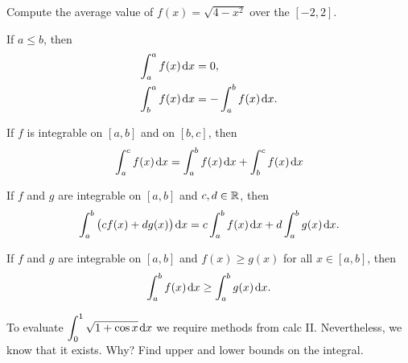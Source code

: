 \begin{example}
Compute the average value of $f(x)=\sqrt{4-x^2}$ over the $[-2,2]$.
\end{example}

\newpage

\begin{definition}
If $a\le b$, then 
\begin{align*}
\int_a^af(x)\mkern 2mu \mathrm{d} x&=0,\\
\int_b^af(x)\mkern 2mu \mathrm{d} x&=-\int_a^bf(x)\mkern 2mu \mathrm{d} x.
\end{align*}
\end{definition}

\vfill

\begin{theorem}[Additivity]
If $f$ is integrable on $[a,b]$ and on $[b,c]$, then
\begin{equation*}
\int_a^cf(x)\mkern 2mu \mathrm{d} x = \int_a^bf(x)\mkern 2mu \mathrm{d} x + \int_b^cf(x)\mkern 2mu \mathrm{d} x
\end{equation*}
\end{theorem}

\vfill

\begin{theorem}[Linearity]
If $f$ and $g$ are integrable on $[a,b]$ and $c,d\in\mathbb R$, then
\begin{equation*}
\int_a^b\big(cf(x)+dg(x)\big)\mkern 2mu \mathrm{d} x = c\int_a^bf(x)\mkern 2mu \mathrm{d} x + d\int_a^bg(x)\mkern 2mu \mathrm{d} x.
\end{equation*}
\end{theorem}

\vfill

\begin{theorem}[Domination]
If $f$ and $g$ are integrable on $[a,b]$ and $f(x)\ge g(x)$ for all $x\in [a,b]$, then
\begin{equation*}
\int_a^bf(x)\mkern 2mu \mathrm{d} x\ge \int_a^bg(x)\mkern 2mu \mathrm{d} x.
\end{equation*}
\end{theorem}

\vfill

\newpage

\begin{example}
To evaluate $\displaystyle\int_0^1\sqrt{1+\cos x}\mkern 2mu \mathrm{d} x$ we require methods from calc II.
Nevertheless, we know that it exists.  Why?
Find upper and lower bounds on the integral.
\end{example}

